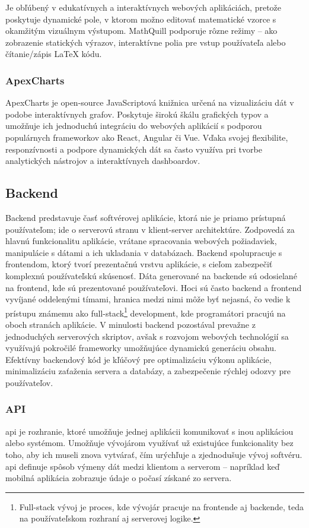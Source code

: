 Je obľúbený v edukatívnych a interaktívnych webových aplikáciách, pretože poskytuje dynamické pole, v ktorom možno editovať matematické vzorce s okamžitým vizuálnym výstupom. 
MathQuill podporuje rôzne režimy – ako zobrazenie statických výrazov, interaktívne polia pre vstup používateľa alebo čítanie/zápis LaTeX kódu.
\subsubsection{ApexCharts}
ApexCharts\cite{apexcharts} je open-source JavaScriptová knižnica určená na vizualizáciu dát v podobe interaktívnych grafov.
 Poskytuje širokú škálu grafických typov a umožňuje ich jednoduchú integráciu do webových aplikácií s podporou populárnych frameworkov ako React, Angular či Vue. 
Vďaka svojej flexibilite, responzívnosti a podpore dynamických dát sa často využíva pri tvorbe analytických nástrojov a interaktívnych dashboardov.

\subsection{Backend}
Backend predstavuje časť softvérovej aplikácie, ktorá nie je priamo prístupná používateľom; ide o serverovú stranu v klient-server architektúre.
 Zodpovedá za hlavnú funkcionalitu aplikácie, vrátane spracovania webových požiadaviek, manipulácie s dátami a ich ukladania v databázach. Backend spolupracuje s frontendom, ktorý tvorí prezentačnú vrstvu aplikácie, s cieľom zabezpečiť komplexnú používateľskú skúsenosť. 
 Dáta generované na backende sú odosielané na frontend, kde sú prezentované používateľovi.
  Hoci sú často backend a frontend vyvíjané oddelenými tímami, hranica medzi nimi môže byť nejasná, čo vedie k prístupu známemu ako full-stack\footnote{Full-stack vývoj je proces, kde vývojár pracuje na frontende aj backende, teda na používateľskom rozhraní aj serverovej logike.} development, kde programátori pracujú na oboch stranách aplikácie.
   V minulosti backend pozostával prevažne z jednoduchých serverových skriptov, avšak s rozvojom webových technológií sa využívajú pokročilé frameworky umožňujúce dynamickú generáciu obsahu.
 Efektívny backendový kód je kľúčový pre optimalizáciu výkonu aplikácie, minimalizáciu zaťaženia servera a databázy, a zabezpečenie rýchlej odozvy pre používateľov. \cite{backend} 
 \subsubsection{API}
 \acrfull{api} je rozhranie, ktoré umožňuje jednej aplikácii komunikovať s inou aplikáciou alebo systémom. 
 Umožňuje vývojárom využívať už existujúce funkcionality bez toho, aby ich museli znova vytvárať, čím urýchľuje a zjednodušuje vývoj softvéru.
  \acrshort{api} definuje spôsob výmeny dát medzi klientom a serverom – napríklad keď mobilná aplikácia zobrazuje údaje o počasí získané zo servera.\cite{api}
